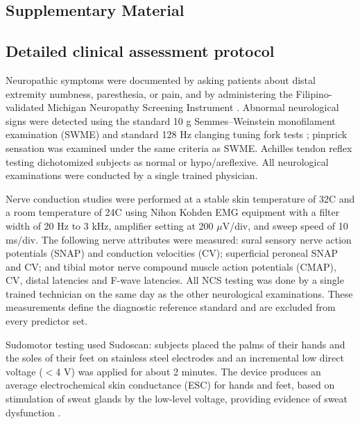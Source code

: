 \documentclass[pdflatex,sn-mathphys-num]{sn-jnl}%
\theoremstyle{thmstyleone}%
\theoremstyle{thmstyletwo}%
\theoremstyle{thmstylethree}%
\begin{document}
\begin{appendices}

\section{Supplementary Material}\label{secA1}

\subsection{Detailed clinical assessment protocol}

Neuropathic symptoms were documented by asking patients about distal extremity numbness,
paresthesia, or pain, and by administering the Filipino-validated Michigan Neuropathy Screening
Instrument \cite{dagang2016validation}. Abnormal neurological signs were detected using the standard
10 g Semmes--Weinstein monofilament examination (SWME) and standard 128 Hz clanging tuning fork tests
\cite{feng2009semmes,oyer2007quantitative}; pinprick sensation was examined under the same criteria
as SWME. Achilles tendon reflex testing dichotomized subjects as normal or hypo/areflexive. All
neurological examinations were conducted by a single trained physician.

Nerve conduction studies were performed at a stable skin temperature of 32\textdegree C and a room
temperature of 24\textdegree C using Nihon Kohden EMG equipment with a filter width of 20 Hz to
3 kHz, amplifier setting at 200 $\mu$V/div, and sweep speed of 10 ms/div. The following nerve
attributes were measured: sural sensory nerve action potentials (SNAP) and conduction velocities
(CV); superficial peroneal SNAP and CV; and tibial motor nerve compound muscle action potentials
(CMAP), CV, distal latencies and F-wave latencies. All NCS testing was done by a single trained
technician on the same day as the other neurological examinations. These measurements define the
diagnostic reference standard and are excluded from every predictor set.

Sudomotor testing used Sudoscan: subjects placed the palms of their hands and the soles of their feet
on stainless steel electrodes and an incremental low direct voltage ($<$4 V) was applied for about
2 minutes. The device produces an average electrochemical skin conductance (ESC) for hands and feet,
based on stimulation of sweat glands by the low-level voltage, providing evidence of sweat
dysfunction \cite{garcia2022detection}.


\end{appendices}
\end{document}
